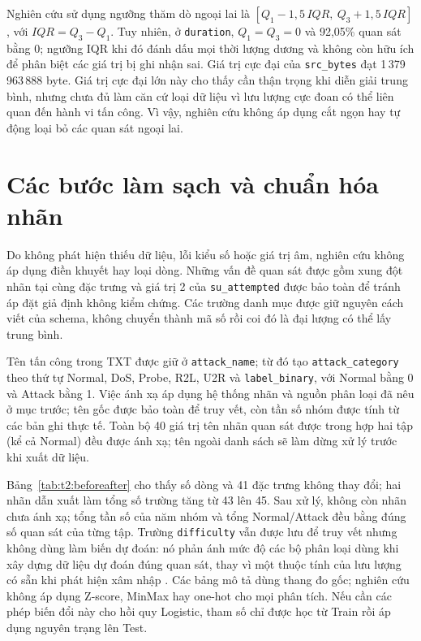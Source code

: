 \documentclass[../main.tex]{subfiles}
\begin{document}
Nghiên cứu sử dụng ngưỡng thăm dò ngoại lai là $[Q_1-1{,}5\,IQR,\ Q_3+1{,}5\,IQR]$, với $IQR=Q_3-Q_1$. Tuy nhiên, ở \texttt{duration}, $Q_1=Q_3=0$ và 92,05\% quan sát bằng 0; ngưỡng IQR khi đó đánh dấu mọi thời lượng dương và không còn hữu ích để phân biệt các giá trị bị ghi nhận sai. Giá trị cực đại của \texttt{src\_bytes} đạt 1\,379\,963\,888 byte. Giá trị cực đại lớn này cho thấy cần thận trọng khi diễn giải trung bình, nhưng chưa đủ làm căn cứ loại dữ liệu vì lưu lượng cực đoan có thể liên quan đến hành vi tấn công. Vì vậy, nghiên cứu không áp dụng cắt ngọn hay tự động loại bỏ các quan sát ngoại lai.

\section{Các bước làm sạch và chuẩn hóa nhãn}
Do không phát hiện thiếu dữ liệu, lỗi kiểu số hoặc giá trị âm, nghiên cứu không áp dụng điền khuyết hay loại dòng. Những vấn đề quan sát được gồm xung đột nhãn tại cùng đặc trưng và giá trị 2 của \texttt{su\_attempted} được bảo toàn để tránh áp đặt giả định không kiểm chứng. Các trường danh mục được giữ nguyên cách viết của schema, không chuyển thành mã số rồi coi đó là đại lượng có thể lấy trung bình.

Tên tấn công trong TXT được giữ ở \texttt{attack\_name}; từ đó tạo \texttt{attack\_category} theo thứ tự Normal, DoS, Probe, R2L, U2R và \texttt{label\_binary}, với Normal bằng 0 và Attack bằng 1. Việc ánh xạ áp dụng hệ thống nhãn và nguồn phân loại đã nêu ở mục trước; tên gốc được bảo toàn để truy vết, còn tần số nhóm được tính từ các bản ghi thực tế. Toàn bộ 40 giá trị tên nhãn quan sát được trong hợp hai tập (kể cả Normal) đều được ánh xạ; tên ngoài danh sách sẽ làm dừng xử lý trước khi xuất dữ liệu.

Bảng~\ref{tab:t2:beforeafter} cho thấy số dòng và 41 đặc trưng không thay đổi; hai nhãn dẫn xuất làm tổng số trường tăng từ 43 lên 45. Sau xử lý, không còn nhãn chưa ánh xạ; tổng tần số của năm nhóm và tổng Normal/Attack đều bằng đúng số quan sát của từng tập.
Trường \texttt{difficulty} vẫn được lưu để truy vết nhưng không dùng làm biến dự đoán: nó phản ánh mức độ các bộ phân loại dùng khi xây dựng dữ liệu dự đoán đúng quan sát, thay vì một thuộc tính của lưu lượng có sẵn khi phát hiện xâm nhập \cite{task2_unb2009}. Các bảng mô tả dùng thang đo gốc; nghiên cứu không áp dụng Z-score, MinMax hay one-hot cho mọi phân tích. Nếu cần các phép biến đổi này cho hồi quy Logistic, tham số chỉ được học từ Train rồi áp dụng nguyên trạng lên Test.
\end{document}
